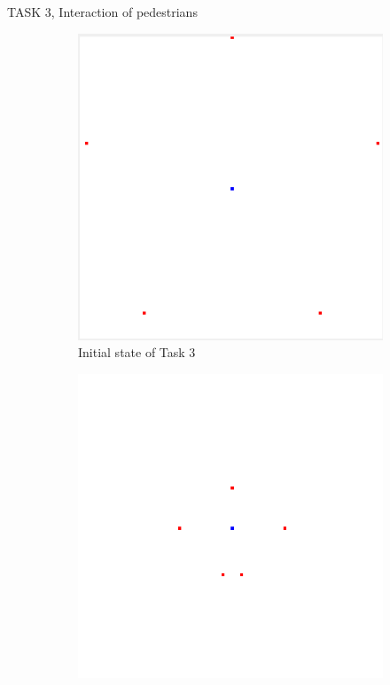 \documentclass[10pt,a4paper]{article}
\begin{document}
\begin{task}{TASK 3, Interaction of pedestrians}
\begin{figure}[htbp]
  \centering
  \begin{subfigure}[b]{0.31\textwidth}
    \includegraphics[width=\textwidth]{pictures/Task3_initial.png}
    \caption{Initial state of Task 3}
    \label{fig:Task3_initial}
  \end{subfigure}
  \begin{subfigure}[b]{0.31\textwidth}
    \includegraphics[width=\textwidth]{pictures/Task3_intermediate.png}

\end{subfigure}
\end{figure}
\end{task}
\end{document}
